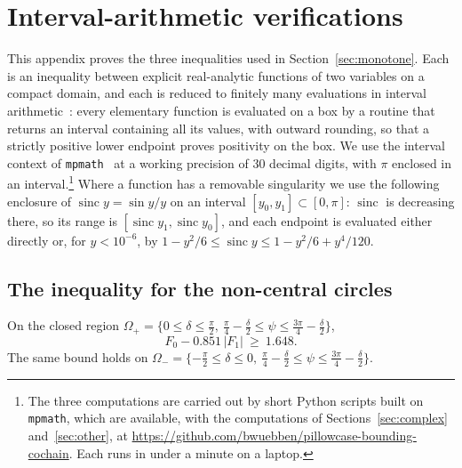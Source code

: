 \section{Interval-arithmetic verifications}\label{app:interval}

This appendix proves the three inequalities used in Section~\ref{sec:monotone}. Each is an inequality between
explicit real-analytic functions of two variables on a compact domain, and each is reduced to finitely many
evaluations in interval arithmetic~\cite{MooreInterval}: every elementary function is evaluated on a box by a routine
that returns an interval containing all its values, with outward rounding, so that a strictly positive lower
endpoint proves positivity on the box. We use the interval context of \texttt{mpmath}~\cite{mpmath} at a working precision
of $30$ decimal digits, with $\pi$ enclosed in an interval.\footnote{The three computations are carried out by
short Python scripts built on \texttt{mpmath}, which are available, with the computations of
Sections~\ref{sec:complex} and~\ref{sec:other}, at \url{https://github.com/bwuebben/pillowcase-bounding-cochain}. Each runs in under a
minute on a laptop.} Where a function has a removable singularity we use the
following enclosure of $\operatorname{sinc}y=\sin y/y$ on an interval $[y_0,y_1]\subset[0,\pi]$: $\operatorname{sinc}$ is decreasing there, so its range is
$[\operatorname{sinc}y_1,\operatorname{sinc}y_0]$, and each endpoint is evaluated either directly or, for $y<10^{-6}$, by
$1-y^2/6\le\operatorname{sinc}y\le1-y^2/6+y^4/120$.

\subsection{The inequality for the non-central circles}

\begin{lemma}\label{lem:ineqA}
On the closed region $\Omega_+=\{0\le\delta\le\frac\pi2,\ \frac\pi4-\frac\delta2\le\psi\le\frac{3\pi}4-\frac\delta2\}$,
\[
F_0-0.851\,|F_1|\ \ge\ 1.648 .
\]
The same bound holds on $\Omega_-=\{-\frac\pi2\le\delta\le0,\ \frac\pi4-\frac\delta2\le\psi\le\frac{3\pi}4-\frac\delta2\}$.
\end{lemma}

